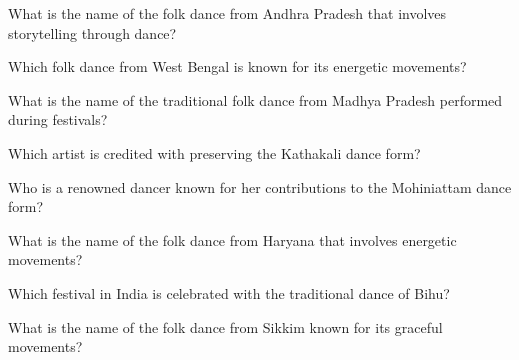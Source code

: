 \documentclass[12pt,a4paper]{book}
\begin{document}
\begin{enhancedmcq}[Question 22]{What is the name of the folk dance from Andhra Pradesh that involves storytelling through dance?}
\end{enhancedmcq}

\begin{enhancedmcq}[Question 23]{Which folk dance from West Bengal is known for its energetic movements?}
\end{enhancedmcq}

\begin{enhancedmcq}[Question 24]{What is the name of the traditional folk dance from Madhya Pradesh performed during festivals?}
\end{enhancedmcq}

\begin{enhancedmcq}[Question 25]{Which artist is credited with preserving the Kathakali dance form?}
\end{enhancedmcq}

\begin{enhancedmcq}[Question 26]{Who is a renowned dancer known for her contributions to the Mohiniattam dance form?}
\end{enhancedmcq}

\begin{enhancedmcq}[Question 27]{What is the name of the folk dance from Haryana that involves energetic movements?}
\end{enhancedmcq}

\begin{enhancedmcq}[Question 28]{Which festival in India is celebrated with the traditional dance of Bihu?}
\end{enhancedmcq}

\begin{enhancedmcq}[Question 29]{What is the name of the folk dance from Sikkim known for its graceful movements?}
\end{enhancedmcq}
\end{document}

